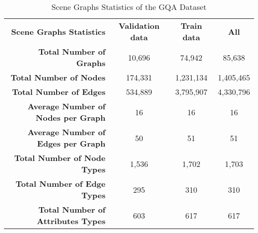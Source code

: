 \documentclass[11pt]{article}
\begin{document}
\begin{table*}[htb]
    \centering
    \small
    \begin{adjustbox}{max width=0.9\textwidth}
    \begin{tabular}[t]{rccc}
        \cmidrule[\heavyrulewidth]{1-4}

        \textbf{ Scene Graphs Statistics } & \textbf{Validation data}  & \textbf{Train data} & \textbf{All}\\
        \cmidrule{1-4}
        \textbf{Total Number of Graphs}             &      10,696 & 74,942 & 85,638   \\
        \textbf{Total Number of Nodes}                 &   174,331 & 1,231,134& 1,405,465   \\
        \textbf{Total Number of Edges}              &  534,889 & 3,795,907& 4,330,796   \\
        \textbf{Average Number of Nodes per Graph}   &  16& 16& 16   \\
        \textbf{Average Number of Edges per Graph}& 50& 51& 51   \\
        \textbf{Total Number of Node Types}           &  1,536 & 1,702& 1,703   \\
        \textbf{Total Number of Edge Types}         &  295 & 310& 310   \\
        \textbf{Total Number of Attributes Types}       &  603 & 617& 617   \\

        \cmidrule[\heavyrulewidth]{1-4}
    \end{tabular}
    \end{adjustbox}
    \caption{ 
    \small
    Scene Graphs Statistics of the GQA Dataset
    }
    \label{tab:stats}
\end{table*}
\end{document}
